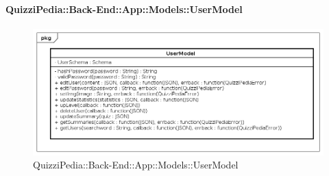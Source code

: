 \paragraph{QuizziPedia::Back-End::App::Models::UserModel}
\label{QuizziPedia::Back-End::App::Models::UserModel}
\begin{figure}
	\centering
	\includegraphics[scale=0.45]{UML/Package/QuizziPedia_Back-End_App_Models_userModel.png}
	\caption{QuizziPedia::Back-End::App::Models::UserModel}
\end{figure}
\FloatBarrier
